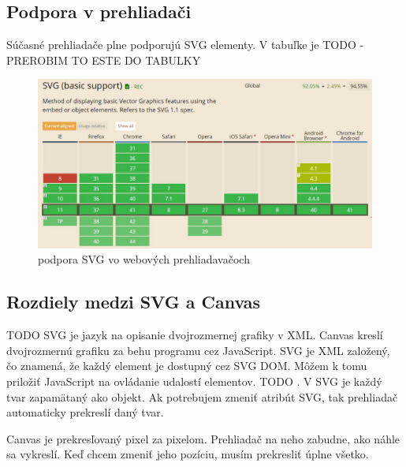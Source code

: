  
 \subsection{Podpora v prehliadači}
 Súčasné prehliadače plne podporujú SVG elementy.
 V tabuľke je TODO - PREROBIM TO ESTE DO TABULKY 
 \begin{figure}
\centering
\includegraphics[width=0.7\linewidth]{obrazky/podpora}
\caption{podpora SVG vo webových prehliadavačoch}
\label{fig:podpora}
\end{figure}

 
 
 \subsection{Rozdiely medzi SVG a Canvas}
TODO 
 SVG je jazyk na opisanie dvojrozmernej grafiky v XML. 
 Canvas kreslí dvojrozmernú grafiku za behu programu cez JavaScript.
 SVG je XML založený, čo znamená, že každý element je dostupný cez SVG DOM. Môžem k tomu priložiť JavaScript na ovládanie udalostí elementov. TODO . 
 V SVG je každý tvar zapamätaný ako objekt. Ak potrebujem zmeniť atribút SVG, tak prehliadač  automaticky prekreslí daný tvar.
 
 
 Canvas je prekresľovaný pixel za pixelom. Prehliadač na neho zabudne, ako náhle sa vykreslí. Keď chcem zmeniť jeho pozíciu, musím prekresliť úplne všetko. 
 
 
 
